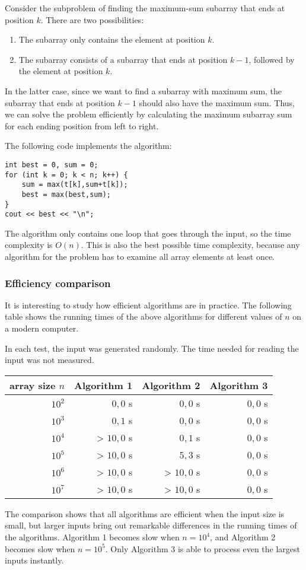 Consider the subproblem of finding the maximum-sum subarray
that ends at position $k$.
There are two possibilities:
\begin{enumerate}
\item The subarray only contains the element at position $k$.
\item The subarray consists of a subarray that ends
at position $k-1$, followed by the element at position $k$.
\end{enumerate}

In the latter case, since we want to
find a subarray with maximum sum,
the subarray that ends at position $k-1$
should also have the maximum sum.
Thus, we can solve the problem efficiently
by calculating the maximum subarray sum
for each ending position from left to right.

The following code implements the algorithm:
\begin{lstlisting}
int best = 0, sum = 0;
for (int k = 0; k < n; k++) {
    sum = max(t[k],sum+t[k]);
    best = max(best,sum);
}
cout << best << "\n";
\end{lstlisting}

The algorithm only contains one loop
that goes through the input,
so the time complexity is $O(n)$.
This is also the best possible time complexity,
because any algorithm for the problem
has to examine all array elements at least once.

\subsubsection{Efficiency comparison}

It is interesting to study how efficient 
algorithms are in practice.
The following table shows the running times
of the above algorithms for different
values of $n$ on a modern computer.

In each test, the input was generated randomly.
The time needed for reading the input was not
measured.

\begin{center}
\begin{tabular}{rrrr}
array size $n$ & Algorithm 1 & Algorithm 2 & Algorithm 3 \\
\hline
$10^2$ & $0{,}0$ s & $0{,}0$ s & $0{,}0$ s \\
$10^3$ & $0{,}1$ s & $0{,}0$ s & $0{,}0$ s \\
$10^4$ & > $10,0$ s & $0{,}1$ s & $0{,}0$ s \\
$10^5$ & > $10,0$ s & $5{,}3$ s & $0{,}0$ s \\
$10^6$ & > $10,0$ s & > $10,0$ s & $0{,}0$ s \\
$10^7$ & > $10,0$ s & > $10,0$ s & $0{,}0$ s \\
\end{tabular}
\end{center}

The comparison shows that all algorithms
are efficient when the input size is small,
but larger inputs bring out remarkable
differences in the running times of the algorithms.
Algorithm 1 becomes slow
when $n=10^4$, and Algorithm 2
becomes slow when $n=10^5$.
Only Algorithm 3 is able to process
even the largest inputs instantly.
